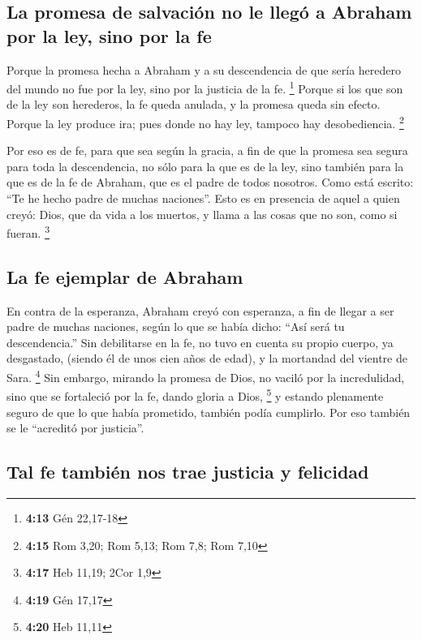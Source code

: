 \hypertarget{la-promesa-de-salvaciuxf3n-no-le-lleguxf3-a-abraham-por-la-ley-sino-por-la-fe}{%
\subsection{La promesa de salvación no le llegó a Abraham por la ley,
sino por la
fe}\label{la-promesa-de-salvaciuxf3n-no-le-lleguxf3-a-abraham-por-la-ley-sino-por-la-fe}}

 Porque la promesa hecha a Abraham y a su descendencia de
que sería heredero del mundo no fue por la ley, sino por la justicia de
la fe. \footnote{\textbf{4:13} Gén 22,17-18}  Porque si
los que son de la ley son herederos, la fe queda anulada, y la promesa
queda sin efecto.  Porque la ley produce ira; pues donde
no hay ley, tampoco hay desobediencia. \footnote{\textbf{4:15} Rom 3,20;
  Rom 5,13; Rom 7,8; Rom 7,10}

 Por eso es de fe, para que sea según la gracia, a fin de
que la promesa sea segura para toda la descendencia, no sólo para la que
es de la ley, sino también para la que es de la fe de Abraham, que es el
padre de todos nosotros.  Como está escrito: ``Te he
hecho padre de muchas naciones''. Esto es en presencia de aquel a quien
creyó: Dios, que da vida a los muertos, y llama a las cosas que no son,
como si fueran. \footnote{\textbf{4:17} Heb 11,19; 2Cor 1,9}

\hypertarget{la-fe-ejemplar-de-abraham}{%
\subsection{La fe ejemplar de Abraham}\label{la-fe-ejemplar-de-abraham}}

 En contra de la esperanza, Abraham creyó con esperanza,
a fin de llegar a ser padre de muchas naciones, según lo que se había
dicho: ``Así será tu descendencia.''  Sin debilitarse en
la fe, no tuvo en cuenta su propio cuerpo, ya desgastado, (siendo él de
unos cien años de edad), y la mortandad del vientre de Sara. \footnote{\textbf{4:19}
  Gén 17,17}  Sin embargo, mirando la promesa de Dios, no
vaciló por la incredulidad, sino que se fortaleció por la fe, dando
gloria a Dios, \footnote{\textbf{4:20} Heb 11,11}  y
estando plenamente seguro de que lo que había prometido, también podía
cumplirlo.  Por eso también se le ``acreditó por
justicia''.

\hypertarget{tal-fe-tambiuxe9n-nos-trae-justicia-y-felicidad}{%
\subsection{Tal fe también nos trae justicia y
felicidad}\label{tal-fe-tambiuxe9n-nos-trae-justicia-y-felicidad}}

